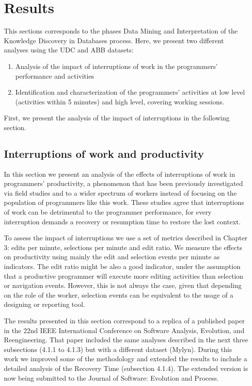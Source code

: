\chapter{Results}


This sections corresponds to the phases Data Mining and Interpretation of the Knowledge Discovery in Databases process. Here, we present two different analyses using the UDC and ABB datasets:
\begin{enumerate}
	\item Analysis of the impact of interruptions of work in the programmers' performance and activities
	\item Identification and characterization of the programmers' activities at low level (activities within 5 minutes) and high level, covering working sessions.
\end{enumerate}

First, we present the analysis of the impact of interruptions in the following section.

\section{Interruptions of work and productivity}
In this section we present an analysis of the effects of interruptions of work in programmers' productivity, a phenomenon that has been previously investigated via field studies and to a wider spectrum of workers \cite{GM04, MGK08, CHW04, ABV12} instead of focusing on the population of programmers like this work. These studies agree that interruptions of work can be detrimental to the programmer performance, for every interruption demands a recovery or resumption time to restore the lost context.

To assess the impact of interruptions we use a set of metrics described in Chapter 3: edits per minute, selections per minute and edit ratio. We measure the effects on productivity using mainly the edit and selection events per minute as indicators. The edit ratio \cite{KM06} might be also a good indicator, under the assumption that a productive programmer will execute more editing activities than selection or navigation events. However, this is not always the case, given that depending on the role of the worker, selection events can be equivalent to the usage of a designing or reporting tool.

The results presented in this section correspond to a replica of a published paper \cite{SRV15} in the 22nd IEEE International Conference on Software Analysis, Evolution, and Reengineering. That paper included the same analyses described in the next three subsections (4.1.1 to 4.1.3) but with a different dataset (Mylyn). During this work we improved some of the methodology and extended the results to include a detailed analysis of the Recovery Time (subsection 4.1.4). The extended version is now being submitted to the Journal of Software: Evolution and Process.


